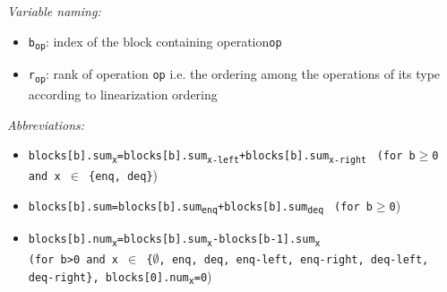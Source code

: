 \documentclass[10pt]{article}
\newcommand{\sub}[1]{\textsubscript{#1}}
\renewcommand{\tt}[1]{\texttt{#1}}
\renewcommand{\it}[1]{\textit{#1}}
\theoremstyle{definition}
\begin{document}
\begin{footnotesize}
  
\it{Variable naming:}
\begin{itemize}
  \item \tt{b\sub{op}}: index of the block containing operation\tt{op}
  \item \tt{r\sub{op}}: rank of operation \tt{op} i.e. the ordering among the operations of its type according to linearization ordering
\end{itemize}

\it{Abbreviations:}
\begin{itemize}
 \item \tt{blocks[b].sum\sub{x}=blocks[b].sum\sub{x-left}+blocks[b].sum\sub{x-right}}  \tt{ (for b$\geq$0 and x $\in$ \{enq, deq\}})
 \item \tt{blocks[b].sum=blocks[b].sum\sub{enq}+blocks[b].sum\sub{deq}}  \tt{ (for b$\geq$0})
  \item \tt{blocks[b].num\sub{x}=blocks[b].sum\sub{x}-blocks[b-1].sum\sub{x}} \\ \tt{(for b>0 and x $\in$ \{$\emptyset$, enq, deq, enq-left, enq-right, deq-left, deq-right\}, blocks[0].num\sub{x}=0})
\end{itemize}
\end{footnotesize}



\end{document}
